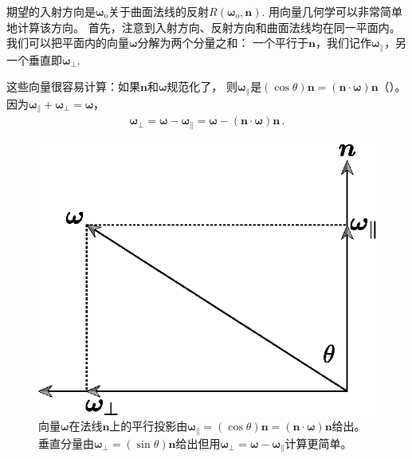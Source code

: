 期望的入射方向是${\bm\omega}_{\mathrm{o}}$关于曲面法线的反射$R({\bm\omega}_{\mathrm{o}},{\bm n})$.
用向量几何学可以非常简单地计算该方向。
首先，注意到入射方向、反射方向和曲面法线均在同一平面内。
我们可以把平面内的向量$\bm\omega$分解为两个分量之和：
一个平行于$\bm n$，我们记作${\bm\omega}_{\parallel}$，另一个垂直即${\bm\omega}_{\perp}$.

这些向量很容易计算：如果$\bm n$和$\bm\omega$规范化了，
则${\bm\omega}_{\parallel}$是$(\cos\theta){\bm n}=({\bm n}\cdot{\bm\omega}){\bm n}$（）。
因为${\bm\omega}_{\parallel}+{\bm\omega}_{\perp}={\bm\omega}$，
\begin{align*}
    {\bm\omega}_{\perp}={\bm\omega}-{\bm\omega}_{\parallel}={\bm\omega}-({\bm n}\cdot{\bm\omega}){\bm n}\, .
\end{align*}
\begin{figure}[htbp]
    \centering
    \includegraphics[width=0.4\linewidth]{Pictures/chap08/Parallelprojectionomeganormal.eps}
    \caption{向量$\bm\omega$在法线$\bm n$上的平行投影由${\bm\omega}_{\parallel}=(\cos\theta){\bm n}=({\bm n}\cdot{\bm\omega}){\bm n}$给出。
    垂直分量由${\bm\omega}_{\perp}=(\sin\theta){\bm n}$给出但用${\bm\omega}_{\perp}={\bm\omega}-{\bm\omega}_{\parallel}$计算更简单。}
    \label{fig:8.7}
\end{figure}

